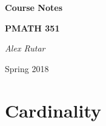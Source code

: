\documentclass[12pt, a4paper]{book}
\theoremstyle{nonumberplain}
\newcommand{\assignmentname}{Course Notes}
\newcommand{\classname}{PMATH 351}
\newcommand{\duedate}{Spring 2018}
\begin{document}
\begin{titlepage}
    \centering
    \vspace{5cm}
    {\huge\textbf{\assignmentname}\par} %
    \vspace{2cm}
    {\Large\textbf{\classname}\par} %
    \vspace{3cm}
    {\Large\textit{Alex Rutar}\par}

    \vfill

    {\large \duedate \par} %
\end{titlepage}
{}
\tableofcontents
{}

\chapter{Cardinality}
\end{document}
